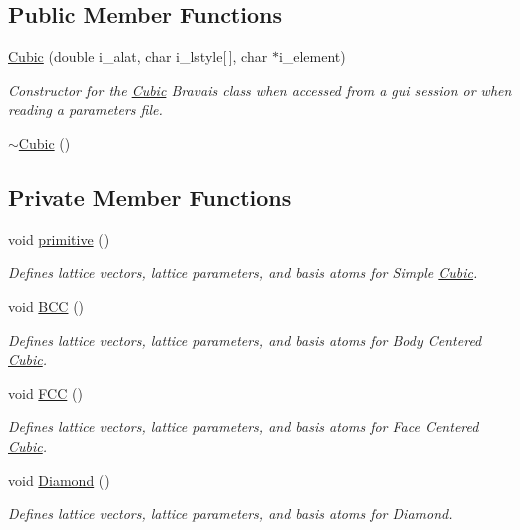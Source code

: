 \subsection*{Public Member Functions}
\begin{DoxyCompactItemize}
\item 
\hyperlink{class_cubic_a6623f1c4fa208bcb35e0ff739fe4f8ef}{Cubic} (double i\+\_\+alat, char i\+\_\+lstyle\mbox{[}$\,$\mbox{]}, char $\ast$i\+\_\+element)
\begin{DoxyCompactList}\small\item\em Constructor for the \hyperlink{class_cubic}{Cubic} Bravais class when accessed from a gui session or when reading a parameters file. \end{DoxyCompactList}\item 
\hyperlink{class_cubic_ad2d13776cf53d7681dcfb1a9feb72116}{$\sim$\+Cubic} ()
\end{DoxyCompactItemize}
\subsection*{Private Member Functions}
\begin{DoxyCompactItemize}
\item 
void \hyperlink{class_cubic_ac7c7d6cb6f96269df131cbe0c2ecb42e}{primitive} ()
\begin{DoxyCompactList}\small\item\em Defines lattice vectors, lattice parameters, and basis atoms for Simple \hyperlink{class_cubic}{Cubic}. \end{DoxyCompactList}\item 
void \hyperlink{class_cubic_ae8cc04295829b5f58eb90207bce4b83b}{B\+C\+C} ()
\begin{DoxyCompactList}\small\item\em Defines lattice vectors, lattice parameters, and basis atoms for Body Centered \hyperlink{class_cubic}{Cubic}. \end{DoxyCompactList}\item 
void \hyperlink{class_cubic_a699d8d8aec47dc6a32b05543024f1f3c}{F\+C\+C} ()
\begin{DoxyCompactList}\small\item\em Defines lattice vectors, lattice parameters, and basis atoms for Face Centered \hyperlink{class_cubic}{Cubic}. \end{DoxyCompactList}\item 
void \hyperlink{class_cubic_ad98a7df81bbf23d7d337a870e709bbc9}{Diamond} ()
\begin{DoxyCompactList}\small\item\em Defines lattice vectors, lattice parameters, and basis atoms for Diamond. \end{DoxyCompactList}\end{DoxyCompactItemize}
